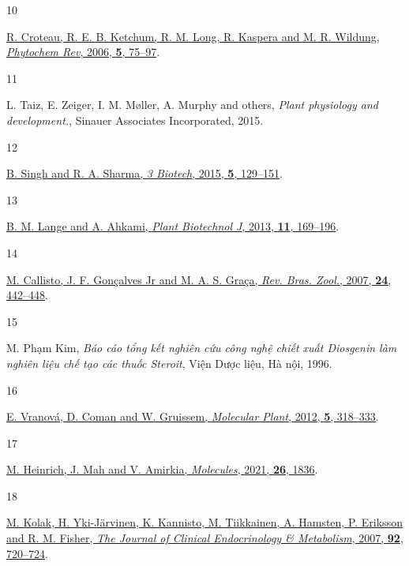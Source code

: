 \documentclass[
  letterpaper,
  DIV=11,
  numbers=noendperiod]{scrartcl}
\newlength{\cslhangindent}
\newlength{\csllabelwidth}
\newenvironment{CSLReferences}[2] %
 {\begin{list}{}{%
  \setlength{\itemindent}{0pt}
  \setlength{\leftmargin}{0pt}
  \setlength{\parsep}{0pt}
  \ifodd #1
   \setlength{\leftmargin}{\cslhangindent}
   \setlength{\itemindent}{-1\cslhangindent}
  \fi
  \setlength{\itemsep}{#2\baselineskip}}}
 {\end{list}}
\newcommand{\CSLLeftMargin}[1]{\parbox[t]{\csllabelwidth}{\strut#1\strut}}
\newcommand{\CSLRightInline}[1]{\parbox[t]{\linewidth - \csllabelwidth}{\strut#1\strut}}
\begin{document}
\begin{CSLReferences}{0}{0}
\CSLLeftMargin{10 }%
\CSLRightInline{\href{https://doi.org/10.1007/s11101-005-3748-2}{R.
Croteau, R. E. B. Ketchum, R. M. Long, R. Kaspera and M. R. Wildung,
\emph{Phytochem Rev}, 2006, \textbf{5}, 75--97}.}

\CSLLeftMargin{11 }%
\CSLRightInline{L. Taiz, E. Zeiger, I. M. Møller, A. Murphy and others,
\emph{Plant physiology and development.}, {Sinauer Associates
Incorporated}, 2015.}

\CSLLeftMargin{12 }%
\CSLRightInline{\href{https://doi.org/10.1007/s13205-014-0220-2}{B.
Singh and R. A. Sharma, \emph{3 Biotech}, 2015, \textbf{5}, 129--151}.}

\CSLLeftMargin{13 }%
\CSLRightInline{\href{https://doi.org/10.1111/pbi.12022}{B. M. Lange and
A. Ahkami, \emph{Plant Biotechnol J}, 2013, \textbf{11}, 169--196}.}

\CSLLeftMargin{14 }%
\CSLRightInline{\href{https://doi.org/10.1590/S0101-81752007000200023}{M.
Callisto, J. F. Gonçalves Jr and M. A. S. Graça, \emph{Rev. Bras.
Zool.}, 2007, \textbf{24}, 442--448}.}

\CSLLeftMargin{15 }%
\CSLRightInline{M. Phạm Kim, \emph{Báo cáo tổng kết nghiên cứu công nghệ
chiết xuất Diosgenin làm nghiên liệu chế tạo các thuốc Steroit}, {Viện
Dược liệu}, {Hà nội}, 1996.}

\CSLLeftMargin{16 }%
\CSLRightInline{\href{https://doi.org/10.1093/mp/sss015}{E. Vranová, D.
Coman and W. Gruissem, \emph{Molecular Plant}, 2012, \textbf{5},
318--333}.}

\CSLLeftMargin{17 }%
\CSLRightInline{\href{https://doi.org/10.3390/molecules26071836}{M.
Heinrich, J. Mah and V. Amirkia, \emph{Molecules}, 2021, \textbf{26},
1836}.}

\CSLLeftMargin{18 }%
\CSLRightInline{\href{https://doi.org/2016092613233300554}{M. Kolak, H.
Yki-Järvinen, K. Kannisto, M. Tiikkainen, A. Hamsten, P. Eriksson and R.
M. Fisher, \emph{The Journal of Clinical Endocrinology \& Metabolism},
2007, \textbf{92}, 720--724}.}


\end{CSLReferences}
\end{document}
